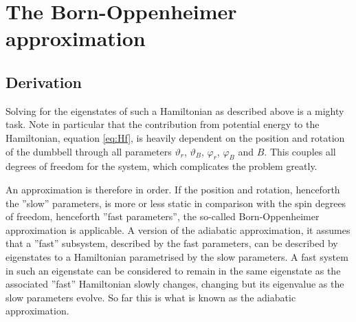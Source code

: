 \documentclass[a4paper]{article}
\begin{document}
\section{The Born-Oppenheimer approximation}
\subsection{Derivation}
Solving for the eigenstates of such a Hamiltonian as described above is a mighty task. Note
in particular that the contribution from potential energy to the Hamiltonian, equation
\ref{eq:Hf}, is heavily dependent on the position and rotation of the dumbbell through all
parameters \(\vartheta_r \), \(\vartheta_B\), \(\varphi_r\),
\(\varphi_B\) and \(B\). This couples all degrees of freedom for the system, which complicates
the problem greatly.

An approximation is therefore in order. If the position and rotation,
henceforth the ''slow'' parameters,
is more or less static in comparison with the spin degrees of freedom, henceforth ''fast
parameters'', the so-called Born-Oppenheimer approximation is applicable. A version of the
adiabatic approximation, it assumes that a ''fast'' subsystem, described by the fast
parameters, can be described by eigenstates to a Hamiltonian parametrised by the slow
parameters. A fast system in such an eigenstate can be considered to remain in the same
eigenstate as the associated ''fast'' Hamiltonian slowly changes, changing but its
eigenvalue as the slow parameters evolve. So far this is what is known as the adiabatic
approximation. 
\end{document}
